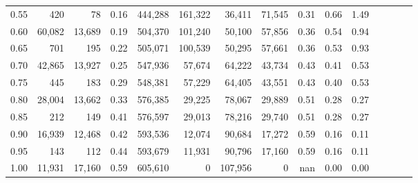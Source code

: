 \begin{tabular}{rrrcrrrrrrrrrrr}
0.55 &     420 &      78 &                                       0.16 &  444,288 &  161,322 &   36,411 &   71,545 &  0.31 &  0.66 &                         1.49 \\
0.60 &  60,082 &  13,689 &                                       0.19 &  504,370 &  101,240 &   50,100 &   57,856 &  0.36 &  0.54 &                         0.94 \\
0.65 &     701 &     195 &                                       0.22 &  505,071 &  100,539 &   50,295 &   57,661 &  0.36 &  0.53 &                         0.93 \\
0.70 &  42,865 &  13,927 &                                       0.25 &  547,936 &   57,674 &   64,222 &   43,734 &  0.43 &  0.41 &                         0.53 \\
0.75 &     445 &     183 &                                       0.29 &  548,381 &   57,229 &   64,405 &   43,551 &  0.43 &  0.40 &                         0.53 \\
0.80 &  28,004 &  13,662 &                                       0.33 &  576,385 &   29,225 &   78,067 &   29,889 &  0.51 &  0.28 &                         0.27 \\
0.85 &     212 &     149 &                                       0.41 &  576,597 &   29,013 &   78,216 &   29,740 &  0.51 &  0.28 &                         0.27 \\
0.90 &  16,939 &  12,468 &                                       0.42 &  593,536 &   12,074 &   90,684 &   17,272 &  0.59 &  0.16 &                         0.11 \\
0.95 &     143 &     112 &                                       0.44 &  593,679 &   11,931 &   90,796 &   17,160 &  0.59 &  0.16 &                         0.11 \\
1.00 &  11,931 &  17,160 &                                       0.59 &  605,610 &        0 &  107,956 &        0 &   nan &  0.00 &                         0.00 \\
\bottomrule
\end{tabular}
